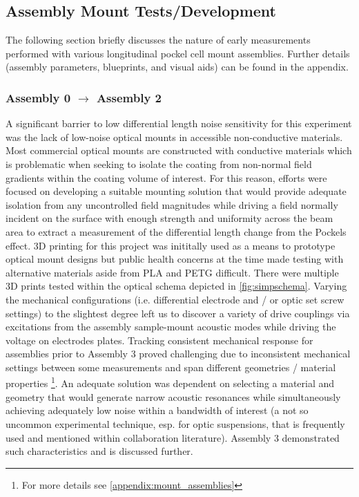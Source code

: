\subsection{Assembly Mount Tests/Development}
The following section briefly discusses the nature of early measurements performed with various longitudinal pockel cell mount assemblies. Further details (assembly parameters, blueprints, and visual aids) can be found in the appendix. 

\subsubsection{Assembly 0 $\rightarrow$ Assembly 2}
A significant barrier to low differential length noise sensitivity for this experiment was the lack of low-noise optical mounts in accessible non-conductive materials. Most commercial optical mounts are constructed with conductive materials which is problematic when seeking to isolate the coating from non-normal field gradients within the coating volume of interest.  For this reason, efforts were focused on developing a suitable mounting solution that would provide adequate isolation from any uncontrolled field magnitudes while driving a field normally incident on the surface with enough strength and uniformity across the beam area to extract a measurement of the differential length change from the Pockels effect. 3D printing for this project was inititally used as a means to prototype optical mount designs but public health concerns at the time made testing with alternative materials aside from PLA and PETG difficult. There were multiple 3D prints tested within the optical schema depicted in \autoref{fig:simpschema}. Varying the mechanical configurations (i.e. differential electrode and / or optic set screw settings) to the slightest degree left us to discover a variety of drive couplings via excitations from the assembly sample-mount acoustic modes while driving the voltage on electrodes plates. Tracking consistent mechanical response for assemblies prior to Assembly 3 proved challenging due to inconsistent mechanical settings between some measurements and span different geometries / material properties \footnote{For more details see \autoref{appendix:mount_assemblies}}. An adequate solution was dependent on selecting a material and geometry that would generate narrow acoustic resonances while simultaneously achieving adequately low noise within a bandwidth of interest (a not so uncommon experimental technique, esp. for optic suspensions, that is frequently used and mentioned within collaboration literature). Assembly 3 demonstrated such characteristics and is discussed further.


